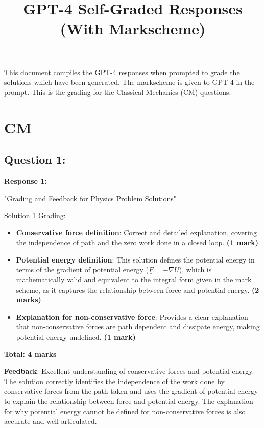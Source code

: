 \documentclass[a4paper,11pt]{article}
\begin{document}
\title{GPT-4 Self-Graded Responses (With Markscheme)}
\maketitle

This document compiles the GPT-4 responses when prompted to grade the solutions which have been generated. The markscheme is given to GPT-4 in the prompt. This is the grading for the Classical Mechanics (CM) questions. 

\section{CM}

\subsection*{Question 1:}

\textbf{Response 1:}

"Grading and Feedback for Physics Problem Solutions"

Solution 1 Grading:

\begin{itemize}
    \item \textbf{Conservative force definition}: Correct and detailed explanation, covering the independence of path and the zero work done in a closed loop. \textbf{(1 mark)}
    \item \textbf{Potential energy definition}: This solution defines the potential energy in terms of the gradient of potential energy (\( \underline{F} = -\underline{\nabla} U \)), which is mathematically valid and equivalent to the integral form given in the mark scheme, as it captures the relationship between force and potential energy. \textbf{(2 marks)}
    \item \textbf{Explanation for non-conservative force}: Provides a clear explanation that non-conservative forces are path dependent and dissipate energy, making potential energy undefined. \textbf{(1 mark)}
\end{itemize}

\textbf{Total: 4 marks}

\textbf{Feedback}: Excellent understanding of conservative forces and potential energy. The solution correctly identifies the independence of the work done by conservative forces from the path taken and uses the gradient of potential energy to explain the relationship between force and potential energy. The explanation for why potential energy cannot be defined for non-conservative forces is also accurate and well-articulated.
\end{document}
